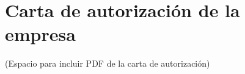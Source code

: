 \section{Carta de autorización de la empresa}
(Espacio para incluir PDF de la carta de autorización)
